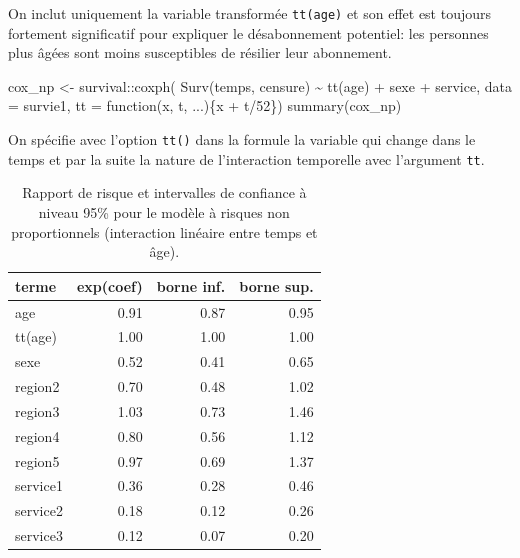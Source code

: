 \documentclass[
  11pt,
  letterpaper,
]{scrbook}
\newenvironment{Shaded}{\begin{snugshade}}{\end{snugshade}}
\newcommand{\AttributeTok}[1]{\textcolor[rgb]{0.40,0.45,0.13}{#1}}
\newcommand{\ControlFlowTok}[1]{\textcolor[rgb]{0.00,0.23,0.31}{#1}}
\newcommand{\DecValTok}[1]{\textcolor[rgb]{0.68,0.00,0.00}{#1}}
\newcommand{\FunctionTok}[1]{\textcolor[rgb]{0.28,0.35,0.67}{#1}}
\newcommand{\NormalTok}[1]{\textcolor[rgb]{0.00,0.23,0.31}{#1}}
\newcommand{\OtherTok}[1]{\textcolor[rgb]{0.00,0.23,0.31}{#1}}
\newcommand{\SpecialCharTok}[1]{\textcolor[rgb]{0.37,0.37,0.37}{#1}}
\theoremstyle{definition}
\theoremstyle{remark}
\begin{document}
On inclut uniquement la variable transformée \texttt{tt(age)} et son
effet est toujours fortement significatif pour expliquer le
désabonnement potentiel: les personnes plus âgées sont moins
susceptibles de résilier leur abonnement.

\begin{Shaded}
\begin{Highlighting}[]
\NormalTok{cox\_np }\OtherTok{\textless{}{-}}\NormalTok{ survival}\SpecialCharTok{::}\FunctionTok{coxph}\NormalTok{(}
    \FunctionTok{Surv}\NormalTok{(temps, censure) }\SpecialCharTok{\textasciitilde{}} 
     \FunctionTok{tt}\NormalTok{(age) }\SpecialCharTok{+}\NormalTok{ sexe }\SpecialCharTok{+}\NormalTok{ service, }
     \AttributeTok{data =}\NormalTok{ survie1, }
     \AttributeTok{tt =} \ControlFlowTok{function}\NormalTok{(x, t, ...)\{x }\SpecialCharTok{+}\NormalTok{ t}\SpecialCharTok{/}\DecValTok{52}\NormalTok{\})}
\FunctionTok{summary}\NormalTok{(cox\_np)}
\end{Highlighting}
\end{Shaded}

On spécifie avec l'option \texttt{tt()} dans la formule la variable qui
change dans le temps et par la suite la nature de l'interaction
temporelle avec l'argument \texttt{tt}.

\hypertarget{tbl-cox-np}{}
\begin{table}
\caption{\label{tbl-cox-np}Rapport de risque et intervalles de confiance à niveau 95\% pour le
modèle à risques non proportionnels (interaction linéaire entre temps et
âge). }\tabularnewline

\centering
\begin{tabular}{lrrr}
\toprule
terme & exp(coef) & borne inf. & borne sup.\\
\midrule
age & 0.91 & 0.87 & 0.95\\
tt(age) & 1.00 & 1.00 & 1.00\\
sexe & 0.52 & 0.41 & 0.65\\
region2 & 0.70 & 0.48 & 1.02\\
region3 & 1.03 & 0.73 & 1.46\\
\addlinespace
region4 & 0.80 & 0.56 & 1.12\\
region5 & 0.97 & 0.69 & 1.37\\
service1 & 0.36 & 0.28 & 0.46\\
service2 & 0.18 & 0.12 & 0.26\\
service3 & 0.12 & 0.07 & 0.20\\
\bottomrule
\end{tabular}
\end{table}
\end{document}

